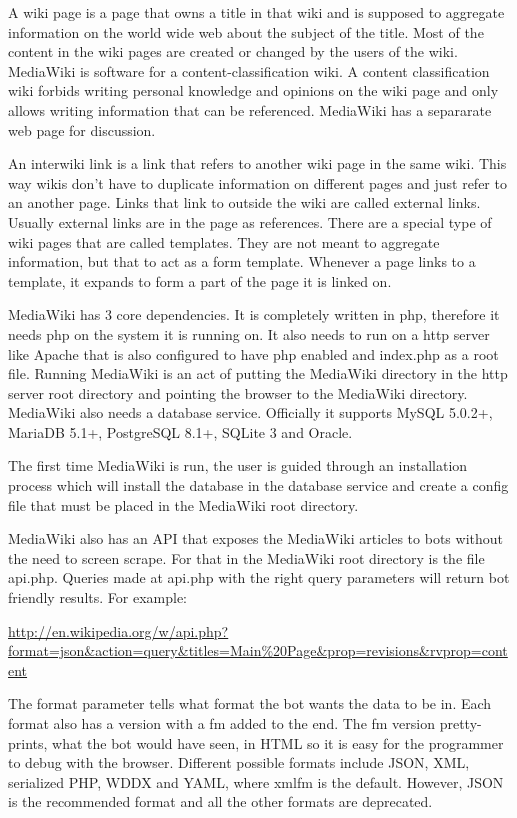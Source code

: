 A wiki page is a page that owns a title in that wiki and is supposed to
aggregate information on the world wide web about the subject of the title. Most
of the content in the wiki pages are created or changed by the users of the
wiki. MediaWiki is software for a content-classification wiki. A content
classification wiki forbids writing personal knowledge and opinions on the wiki
page and only allows writing information that can be referenced. MediaWiki has a
separarate web page for discussion.\cite{wiki:mediawiki-about}

An interwiki link is a link that refers to another wiki page in the same wiki.
This way wikis don't have to duplicate information on different pages and just
refer to an another page. Links that link to outside the wiki are called
external links. Usually external links are in the page as references. There are
a special type of wiki pages that are called templates. They are not meant to
aggregate information, but that to act as a form template. Whenever a page links
to a template, it expands to form a part of the page it is linked on.

MediaWiki has 3 core dependencies. It is completely written in php, therefore it
needs php on the system it is running on. It also needs to run on a http server
like Apache that is also configured to have php enabled and index.php as a root
file. Running MediaWiki is an act of putting the MediaWiki directory in the http
server root directory and pointing the browser to the MediaWiki directory.
MediaWiki also needs a database service. Officially it supports MySQL 5.0.2+,
MariaDB 5.1+, PostgreSQL 8.1+, SQLite 3 and Oracle.\cite{wiki:mediawiki-installation-requirements}

The first time MediaWiki is run, the user is guided through an installation process which will install the database in the database service and create a config file that must be placed in the MediaWiki root directory.

MediaWiki also has an API that exposes the MediaWiki articles to bots without
the need to screen scrape. For that in the MediaWiki root directory is the file
api.php. Queries made at api.php with the right query parameters will return bot
friendly results.\cite{website:mediawiki-api} For example:

\url{http://en.wikipedia.org/w/api.php?format=json&action=query&titles=Main%20Page&prop=revisions&rvprop=content}

The format parameter tells what format the bot wants the data to be in. Each
format also has a version with a fm added to the end. The fm version
pretty-prints, what the bot would have seen, in HTML so it is easy for the
programmer to debug with the browser. Different possible formats include JSON,
XML, serialized PHP, WDDX and YAML, where xmlfm is the default. However, JSON is
the recommended format and all the other formats are deprecated.

